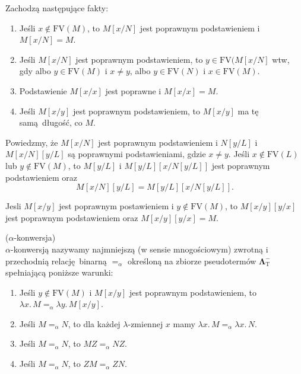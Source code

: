 \noindent Zachodzą następujące fakty:
    \begin{fakt}
      \begin{enumerate}[label=({\alph*})]
        \item Jeśli \(x\not\in\mathrm{FV}(M)\), to \(M[x/N]\) jest poprawnym podstawieniem i \(M[x/N]=M\).
        \item Jeśli \(M[x/N]\) jest poprawnym podstawieniem, to \(y\in\mathrm{FV}(M[x/N]\) wtw, gdy albo \(y\in\mathrm{FV}(M)\)
          i \(x\neq y\), albo \(y\in \mathrm{FV}(N)\) i \(x\in \mathrm{FV}(M)\). 
        \item Podstawienie \(M[x/x]\) jest poprawne i \(M[x/x]=M\).
        \item Jeśli \(M[x/y]\) jest poprawnym podstawieniem, to \(M[x/y]\) ma tę samą długość, co \(M\).
      \end{enumerate}
    \end{fakt}
    \begin{fakt}
      Powiedzmy, że \(M[x/N]\) jest poprawnym podstawieniem i \(N[y/L]\) i \(M[x/N][y/L]\) są poprawnymi podstawieniami, gdzie
      \(x\neq y\). Jeśli \(x\not\in \mathrm{FV}(L)\) lub \(y\not\in\mathrm{FV}(M)\), to \(M[y/L]\) i \( M[y/L]\left[x/N[y/L]\right] \) jest poprawnym podstawieniem oraz
      \[
        M[x/N][y/L]=M[y/L][x/N[y/L]].
      \]
    \end{fakt}

    \begin{fakt}
      Jesli \(M[x/y]\) jest poprawnym postawieniem i \(y\not\in\mathrm{FV}(M)\), to \(M[x/y][y/x]\) jest poprawnym podstawieniem oraz
      \(M[x/y][y/x]=M\).
    \end{fakt}
    
  \begin{definicja}(\(\alpha\)-konwersja)\\
    \(\alpha\)-konwersją nazywamy najmniejszą (w sensie mnogościowym) zwrotną i przechodnią relację binarną \(=_\alpha\) określoną na zbiorze pseudotermów \(\mathbf{\Lambda}^{-}_{\mathrm{T}}\) spełniającą poniższe warunki:
    \begin{enumerate}[label=({\alph*})]
      \item Jeśli \(y\not\in \mathrm{FV}(M)\) i \(M[x/y]\) jest poprawnym podstawieniem, to \(\lambda x.\, M  =_\alpha \lambda y.\, M[x/y]\).
      \item Jeśli \(M=_\alpha N\), to dla każdej \(\lambda\)-zmiennej \(x\) mamy \(\lambda x.\, M =_\alpha \lambda x.\,N\).
      \item Jeśli \(M=_\alpha N\), to \(M Z=_\alpha N Z\).
      \item Jeśli \(M=_\alpha N\), to \(ZM =_\alpha ZN\).
    \end{enumerate}
  \end{definicja}

